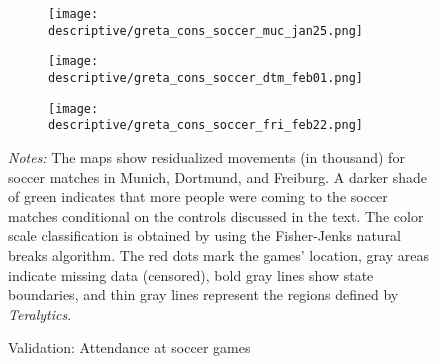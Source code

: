 \vspace*{\fill}\clearpage
\vspace*{\fill}
\begin{figure}[H]\centering
	\begin{subfigure}[h]{0.45\linewidth}\centering
		\texttt{[image: descriptive/greta\_cons\_soccer\_muc\_jan25.png]}
	\end{subfigure}
	\begin{subfigure}[h]{0.45\linewidth}\centering
		\texttt{[image: descriptive/greta\_cons\_soccer\_dtm\_feb01.png]}
	\end{subfigure}
	\begin{subfigure}[h]{0.45\linewidth}\centering
		\texttt{[image: descriptive/greta\_cons\_soccer\_fri\_feb22.png]}
	\end{subfigure}
	
	\begin{minipage}{0.9\linewidth}
		\caption{Validation: Attendance at soccer games}
		\label{fig_greta_cons:participation_soccer_games}
		\scriptsize{\emph{Notes:} The maps show residualized movements (in thousand) for soccer matches in Munich, Dortmund, and Freiburg. A darker shade of green indicates that more people were coming to the soccer matches conditional on the controls discussed in the text. The color scale classification is obtained by using the Fisher-Jenks natural breaks algorithm. The red dots mark the games' location, gray areas indicate missing data (censored), bold gray lines show state boundaries, and thin gray lines represent the regions defined by \textit{Teralytics}.}
	\end{minipage}
\end{figure}
\vspace*{\fill}\clearpage

